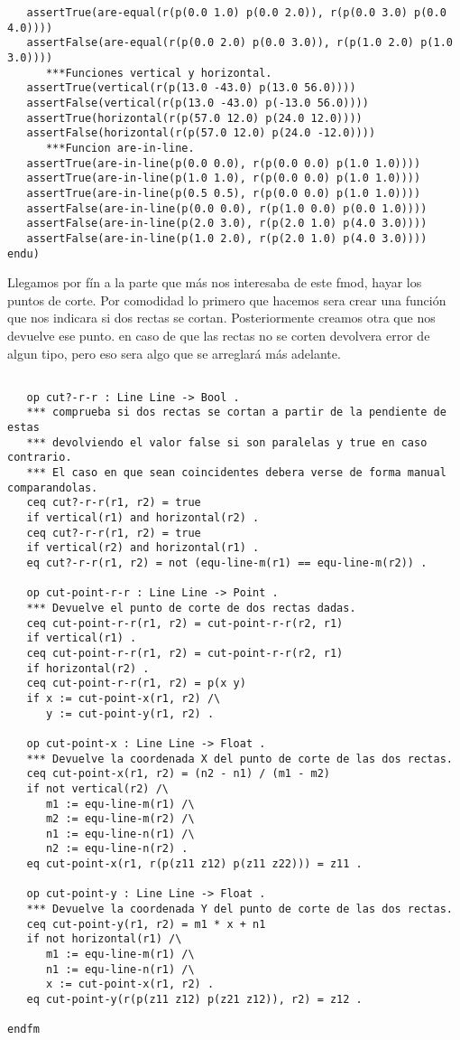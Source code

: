 {\begin{verbatim}
   assertTrue(are-equal(r(p(0.0 1.0) p(0.0 2.0)), r(p(0.0 3.0) p(0.0 4.0))))
   assertFalse(are-equal(r(p(0.0 2.0) p(0.0 3.0)), r(p(1.0 2.0) p(1.0 3.0))))
      ***Funciones vertical y horizontal.
   assertTrue(vertical(r(p(13.0 -43.0) p(13.0 56.0))))
   assertFalse(vertical(r(p(13.0 -43.0) p(-13.0 56.0))))
   assertTrue(horizontal(r(p(57.0 12.0) p(24.0 12.0))))
   assertFalse(horizontal(r(p(57.0 12.0) p(24.0 -12.0))))
      ***Funcion are-in-line.
   assertTrue(are-in-line(p(0.0 0.0), r(p(0.0 0.0) p(1.0 1.0))))
   assertTrue(are-in-line(p(1.0 1.0), r(p(0.0 0.0) p(1.0 1.0))))
   assertTrue(are-in-line(p(0.5 0.5), r(p(0.0 0.0) p(1.0 1.0))))
   assertFalse(are-in-line(p(0.0 0.0), r(p(1.0 0.0) p(0.0 1.0))))
   assertFalse(are-in-line(p(2.0 3.0), r(p(2.0 1.0) p(4.0 3.0))))
   assertFalse(are-in-line(p(1.0 2.0), r(p(2.0 1.0) p(4.0 3.0))))
endu)
\end{verbatim}
}


Llegamos por f\'in a la parte que m\'as nos interesaba de este fmod, hayar los puntos de corte.
Por comodidad lo primero que hacemos sera crear una funci\'on que nos indicara si dos rectas se cortan.
Posteriormente creamos otra que nos devuelve ese punto. en caso de que las rectas no se corten devolvera error de algun tipo, pero eso sera algo que se arreglar\'a m\'as adelante. 

\begin{verbatim}	

   op cut?-r-r : Line Line -> Bool .
   *** comprueba si dos rectas se cortan a partir de la pendiente de estas
   *** devolviendo el valor false si son paralelas y true en caso contrario.
   *** El caso en que sean coincidentes debera verse de forma manual comparandolas.
   ceq cut?-r-r(r1, r2) = true 
   if vertical(r1) and horizontal(r2) .
   ceq cut?-r-r(r1, r2) = true 
   if vertical(r2) and horizontal(r1) .
   eq cut?-r-r(r1, r2) = not (equ-line-m(r1) == equ-line-m(r2)) .

   op cut-point-r-r : Line Line -> Point .
   *** Devuelve el punto de corte de dos rectas dadas.
   ceq cut-point-r-r(r1, r2) = cut-point-r-r(r2, r1)
   if vertical(r1) .
   ceq cut-point-r-r(r1, r2) = cut-point-r-r(r2, r1)
   if horizontal(r2) .
   ceq cut-point-r-r(r1, r2) = p(x y)
   if x := cut-point-x(r1, r2) /\
      y := cut-point-y(r1, r2) .

   op cut-point-x : Line Line -> Float .
   *** Devuelve la coordenada X del punto de corte de las dos rectas.
   ceq cut-point-x(r1, r2) = (n2 - n1) / (m1 - m2)
   if not vertical(r2) /\
      m1 := equ-line-m(r1) /\
      m2 := equ-line-m(r2) /\
      n1 := equ-line-n(r1) /\
      n2 := equ-line-n(r2) .
   eq cut-point-x(r1, r(p(z11 z12) p(z11 z22))) = z11 .
	
   op cut-point-y : Line Line -> Float .
   *** Devuelve la coordenada Y del punto de corte de las dos rectas.
   ceq cut-point-y(r1, r2) = m1 * x + n1
   if not horizontal(r1) /\
      m1 := equ-line-m(r1) /\
      n1 := equ-line-n(r1) /\
      x := cut-point-x(r1, r2) .
   eq cut-point-y(r(p(z11 z12) p(z21 z12)), r2) = z12 .

endfm

\end{verbatim}

